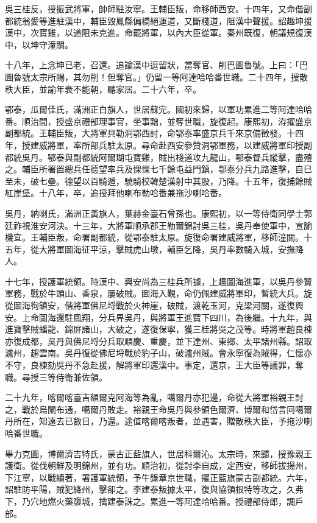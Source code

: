 \begin{pinyinscope}
吳三桂反，授振武將軍，帥師駐汝寧。王輔臣叛，命移師西安。十四年，又命偕副都統翁愛等進駐漢中，輔臣毀鳳縣偏橋絕運道，又斷棧道，阻漢中聲援。詔趣坤援漢中，次寶雞，以道阻未克進。命罷將軍，以內大臣從軍。秦州既復，朝議規復漢中，以坤守潼關。

十八年，上念坤已老，召還。追論漢中逗留狀，當奪官、削巴圖魯號。上曰：「巴圖魯號太宗所賜，其勿削！但奪官。」仍留一等阿達哈哈番世職。二十四年，授散秩大臣，並諭年衰不能朝，聽家居。二十六年，卒。

鄂泰，瓜爾佳氏，滿洲正白旗人，世居蘇完。國初來歸，以軍功累進二等阿達哈哈番。順治間，授盛京禮部理事官，坐事黜，並奪世職，旋復起。康熙初，洊擢盛京副都統。王輔臣叛，大將軍貝勒洞鄂西討，命鄂泰率盛京兵千來京備徵發。十四年，授建威將軍，率所部兵駐太原。尋命赴西安參贊洞鄂軍務，以建威將軍印授副都統吳丹。鄂泰與副都統阿爾瑚屯寶雞，賊出棧道攻九龍山，鄂泰督兵縱擊，盡殪之。輔臣所署置總兵任德望率兵及惈惈七千餘屯益門鎮，鄂泰分兵九路進擊，自巳至未，破七壘。德望以百騎遁，驍騎校韓楚漢射中其股，乃降。十五年，復捕餘賊紅崖堡。十八年，卒，追授拜他喇布勒哈番兼拖沙喇哈番。

吳丹，納喇氏，滿洲正黃旗人，葉赫金臺石曾孫也。康熙初，以一等侍衛同學士郭廷祚視淮安河決。十三年，大將軍順承郡王勒爾錦討吳三桂，吳丹奉使軍中，宣諭機宜。王輔臣叛，命署副都統，從鄂泰駐太原。旋復命署建威將軍，移師潼關。十五年，從大將軍圖海征平涼，擊賊虎山墩，輔臣乞降，吳丹率數騎入城，安撫降人。

十七年，授護軍統領。時漢中、興安尚為三桂兵所據，上趣圖海進軍，以吳丹參贊軍務，戰於牛頭山、香泉，屢破賊。圖海入覲，命仍佩建威將軍印，暫統大兵。旋從圖海徇鎮安，偕將軍佛尼埒戰於火神崖，破賊，渡乾玉河，克梁河關，遂復興安。上命圖海還駐鳳翔，分兵畀吳丹，與將軍王進寶下四川，為後繼。十九年，與進寶擊賊蟠龍、錦屏諸山，大破之，遂復保寧，獲三桂將吳之茂等。時將軍趙良棟亦復成都，吳丹與佛尼埒分兵取順慶、重慶，並下達州、東鄉、太平諸州縣。詔取瀘州，趨雲南。吳丹復從佛尼埒戰於豹子山，破瀘州賊。會永寧復為賊得，仁懷亦不守，良棟劾吳丹不急赴援，解將軍印還漢中。事定，還京，王大臣等議罪，奪職。尋授三等侍衛兼佐領。

二十九年，喀爾喀臺吉額爾克阿海等為亂，噶爾丹亦犯邊，命從大將軍裕親王討之，戰於烏闌布通，噶爾丹敗走。裕親王命吳丹與參領色爾濟、博爾和岱言冋噶爾丹所在，知遠去已數日，乃還。途值喀爾喀叛者，並遇害，贈散秩大臣，予拖沙喇哈番世職。

畢力克圖，博爾濟吉特氏，蒙古正藍旗人，世居科爾沁。太宗時，來歸，授豫親王護衛。從伐朝鮮及明錦州，並有功。順治初，從討李自成，定西安，移師拔揚州，下江寧，以戰績著，署護軍統領，予牛錄章京世職，擢正藍旗蒙古副都統。六年，詔駐防平陽，賊犯絳州，擊卻之。李建泰叛據太平，復與協領根特等攻之，久弗下，乃穴地燃火藥隳城，擒建泰誅之。累進一等阿達哈哈番。授禮部侍郎，調戶部。


\end{pinyinscope}
